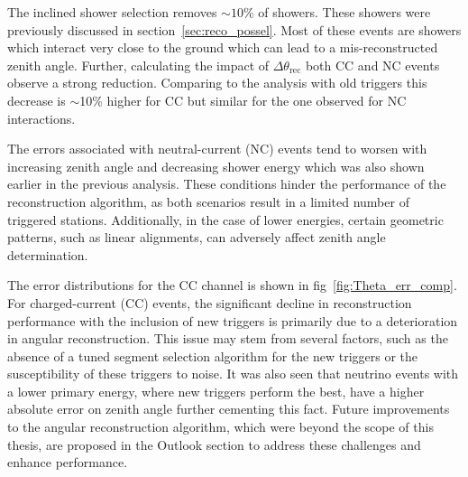 The inclined shower selection removes $\sim 10\%$ of showers. These showers were previously discussed in section~\ref{sec:reco_possel}. Most of these events are showers which interact very close to the ground which can lead to a mis-reconstructed zenith angle. Further, calculating the impact of $\Delta \theta_{\text{rec}}$ both CC and NC events observe a strong reduction. Comparing to the analysis with old triggers this decrease is $\sim$10\% higher for CC but similar for the one observed for NC interactions. 
 
The errors associated with neutral-current (NC) events tend to worsen with increasing zenith angle and decreasing shower energy which was also shown earlier in the previous analysis. These conditions hinder the performance of the reconstruction algorithm, as both scenarios result in a limited number of triggered stations. Additionally, in the case of lower energies, certain geometric patterns, such as linear alignments, can adversely affect zenith angle determination.

The error distributions for the CC channel is shown in fig~\ref{fig:Theta_err_comp}.
For charged-current (CC) events, the significant decline in reconstruction performance with the inclusion of new triggers is primarily due to a deterioration in angular reconstruction. This issue may stem from several factors, such as the absence of a tuned segment selection algorithm for the new triggers or the susceptibility of these triggers to noise. It was also seen that neutrino events with a lower primary energy, where new triggers perform the best, have a higher absolute error on zenith angle further cementing this fact. Future improvements to the angular reconstruction algorithm, which were beyond the scope of this thesis, are proposed in the Outlook section to address these challenges and enhance performance.

